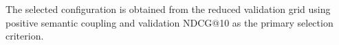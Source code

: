 \begin{table}[htbp]
\centering
\caption{Selected coupled NMF configuration for MovieLens 1M using seed 42.}
\label{tab:ml1m_coupled_selected_config_seed42}
\vspace{0.35em}
\begin{minipage}{0.96\textwidth}
\footnotesize The selected configuration is obtained from the reduced validation grid using positive semantic coupling and validation NDCG@10 as the primary selection criterion.
\end{minipage}
\end{table}

